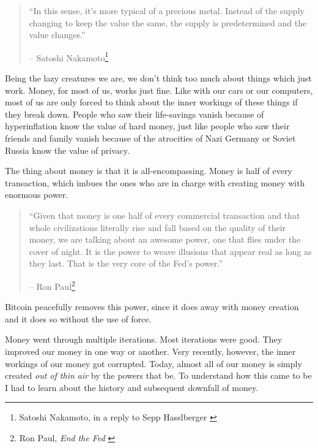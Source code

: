 \begin{quotation}\begin{samepage}
\enquote{In this sense, it's more typical of a precious metal. Instead of the
supply changing to keep the value the same, the supply is
predetermined and the value changes.}
\begin{flushright} -- Satoshi Nakamoto\footnote{Satoshi Nakamoto, in a reply to Sepp
Hasslberger \cite{satoshi-precious-metal}}
\end{flushright}\end{samepage}\end{quotation}

Being the lazy creatures we are, we don't think too much about things
which just work. Money, for most of us, works just fine. Like with our
cars or our computers, most of us are only forced to think about the
inner workings of these things if they break down. People who saw their
life-savings vanish because of hyperinflation know the value of hard
money, just like people who saw their friends and family vanish because
of the atrocities of Nazi Germany or Soviet Russia know the value of
privacy.

The thing about money is that it is all-encompassing. Money is half of
every transaction, which imbues the ones who are in charge with creating
money with enormous power.

\begin{quotation}\begin{samepage}
\enquote{Given that money is one half of every commercial transaction and that
whole civilizations literally rise and fall based on the quality of
their money, we are talking about an awesome power, one that flies
under the cover of night. It is the power to weave illusions that
appear real as long as they last. That is the very core of the
Fed's power.}
\begin{flushright} -- Ron Paul\footnote{Ron Paul, \textit{End the Fed} \cite{end-the-fed}}
\end{flushright}\end{samepage}\end{quotation}

Bitcoin peacefully removes this power, since it does away with money
creation and it does so without the use of force.

Money went through multiple iterations. Most iterations were good. They
improved our money in one way or another. Very recently, however, the
inner workings of our money got corrupted. Today, almost all of our
money is simply created \textit{out of thin air} by the powers that be. To
understand how this came to be I had to learn about the history and
subsequent downfall of money.

